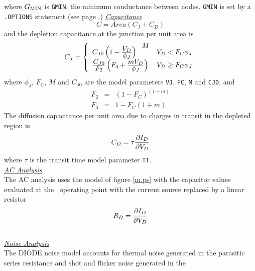 where ${G_{\mbox{\scriptsize MIN}}}$ is {\tt GMIN}, the minimum conductance between
nodes.  {\tt GMIN} is set by a {\tt .OPTIONS} statement (see page
\pageref{.OPTIONSstatement:gmin}.)
\noindent\underline{\sl \large Capacitance}\\[0.1in]
\begin{equation}
C = Area(C_J+C_D)
\end{equation}
and the depletion capacitance at the junction per unit area is
\begin{equation}
C_J = \left\{ \begin{array}{ll}
      C_{J0} \left(1 -
      {{\textstyle V_D}\over{\textstyle \phi_J}}\right)^{\textstyle - M}
      & V_D < F_C\phi_J \\
      {{\textstyle C_{J0}} \over {\textstyle F_2}}
      \left( F_3 + {{\textstyle m V_D}\over{\textstyle \phi_J}}\right)
      & V_D \ge F_C\phi_J \\
      \end{array} \right. %
\label{diode:cj:eqn}
\end{equation}
where
$\phi_J$, $F_C$, $M$ and $C_{J0}$ are the model parameters
{\tt VJ}, {\tt FC}, {\tt M} and {\tt CJ0},
and
\begin{eqnarray}
F_2 & = & ( 1 - F_C ) ^{(1+m)}\\
F_3 & = & 1 - F_C(1+m)
\end{eqnarray}
The diffusion capacitance per unit area
due to charges in transit in the depleted region is
\begin{equation}
C_D = \tau
      {{\textstyle\partial I_D }\over{\textstyle\partial V_D}}
\end{equation}
where $\tau$ is the transit time model parameter {\tt TT}.\\[0.2in]
\noindent\underline{\sl \large AC Analysis}\\[0.1in]
The AC analysis uses the model of figure  \ref{m.ps} with the capacitor values
evaluated at the \dc\ operating point with
the current source replaced by a linear resistor
\begin{equation}
R_D = {{\textstyle\partial I_D} \over {\textstyle\partial V_D}}
\label{diode:rd:eqn}
\end{equation}\\[0.1in]
\noindent\underline{\sl \large Noise Analysis}\\[0.1in]
The DIODE noise model accounts for thermal noise generated in the
parasitic series resistance and shot and flicker noise generated in the
